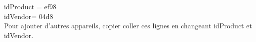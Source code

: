 \documentclass{article}
\begin{document}
idProduct = ef98\\
idVendor= 04d8\\

Pour ajouter d'autres appareils, copier coller ces lignes en changeant idProduct et idVendor. \\

\end{document}
